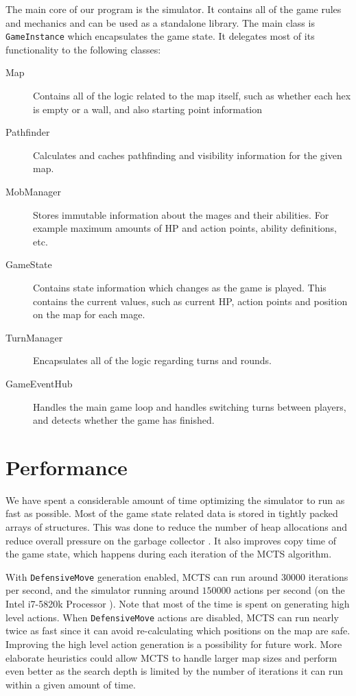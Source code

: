 The main core of our program is the simulator. It contains all of the game rules and mechanics and can be used as a standalone library. The main class is \verb|GameInstance| which encapsulates the game state. It delegates most of its functionality to the following classes:

\begin{description}
	\item[Map] Contains all of the logic related to the map itself, such as whether each hex is empty or a wall, and also starting point information
	
	\item[Pathfinder] Calculates and caches pathfinding and visibility information for the given map.
	
	\item[MobManager] Stores immutable information about the mages and their abilities. For example maximum amounts of HP and action points, ability definitions, etc.
	
	\item[GameState] Contains state information which changes as the game is played. This contains the current values, such as current HP, action points and position on the map for each mage.
	
	\item[TurnManager] Encapsulates all of the logic regarding turns and rounds.
	
	\item[GameEventHub] Handles the main game loop and handles switching turns between players, and detects whether the game has finished.
\end{description}

\section{Performance}

We have spent a considerable amount of time optimizing the simulator to run as fast as possible. Most of the game state related data is stored in tightly packed arrays of structures. This was done to reduce the number of heap allocations and reduce overall pressure on the garbage collector \citep{highperf-dotnet}. It also improves copy time of the game state, which happens during each iteration of the MCTS algorithm.

With \verb|DefensiveMove| generation enabled, MCTS can run around $30000$ iterations per second, and the simulator running around $150000$ actions per second (on the Intel i7-5820k Processor \citep{intel-ark}). Note that most of the time is spent on generating high level actions. When \verb|DefensiveMove| actions are disabled, MCTS can run nearly twice as fast since it can avoid re-calculating which positions on the map are safe. Improving the high level action generation is a possibility for future work. More elaborate heuristics could allow MCTS to handle larger map sizes and perform even better as the search depth is limited by the number of iterations it can run within a given amount of time.


